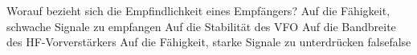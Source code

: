     {Worauf bezieht sich die Empfindlichkeit eines Empfängers?}
    {Auf die Fähigkeit, schwache Signale zu empfangen}
    {Auf die Stabilität des VFO}
    {Auf die Bandbreite des HF-Vorverstärkers}
    {Auf die Fähigkeit, starke Signale zu unterdrücken}
    {false}{false}